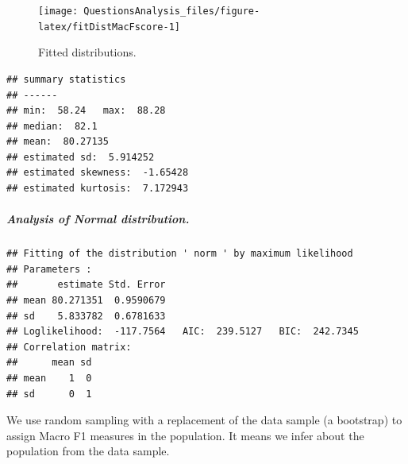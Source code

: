 \documentclass[
]{article}
\newenvironment{Shaded}{\begin{snugshade}}{\end{snugshade}}
\newcommand{\AttributeTok}[1]{\textcolor[rgb]{0.77,0.63,0.00}{#1}}
\newcommand{\DecValTok}[1]{\textcolor[rgb]{0.00,0.00,0.81}{#1}}
\newcommand{\FunctionTok}[1]{\textcolor[rgb]{0.00,0.00,0.00}{#1}}
\newcommand{\NormalTok}[1]{#1}
\newcommand{\OtherTok}[1]{\textcolor[rgb]{0.56,0.35,0.01}{#1}}
\newcommand{\SpecialCharTok}[1]{\textcolor[rgb]{0.00,0.00,0.00}{#1}}
\newcommand{\StringTok}[1]{\textcolor[rgb]{0.31,0.60,0.02}{#1}}
\begin{document}
\begin{figure}

{\centering \texttt{[image: QuestionsAnalysis\_files/figure-latex/fitDistMacFscore-1]} 

}

\caption{Fitted distributions.}\label{fig:fitDistMacFscore}
\end{figure}

\begin{verbatim}
## summary statistics
## ------
## min:  58.24   max:  88.28 
## median:  82.1 
## mean:  80.27135 
## estimated sd:  5.914252 
## estimated skewness:  -1.65428 
## estimated kurtosis:  7.172943
\end{verbatim}

\hypertarget{analysis-of-normal-distribution.-1}{%
\subparagraph{Analysis of Normal distribution.}\label{analysis-of-normal-distribution.-1}}

\begin{Shaded}
\end{Shaded}

\begin{verbatim}
## Fitting of the distribution ' norm ' by maximum likelihood 
## Parameters : 
##       estimate Std. Error
## mean 80.271351  0.9590679
## sd    5.833782  0.6781633
## Loglikelihood:  -117.7564   AIC:  239.5127   BIC:  242.7345 
## Correlation matrix:
##      mean sd
## mean    1  0
## sd      0  1
\end{verbatim}

We use random sampling with a replacement of the data sample (a bootstrap) to assign Macro F1 measures in the population. It means we infer about the population from the data sample.

\begin{Shaded}
\end{Shaded}
\end{document}
